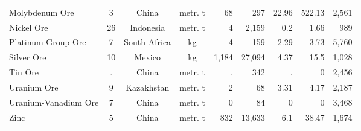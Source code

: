 \begin{tabular}{lcccrrrrr}
Molybdenum Ore & 3     & China & metr. t & 68    & 297   & 22.96 & 522.13 & 2,561  \\
Nickel Ore & 26    & Indonesia & metr. t & 4     & 2,159  & 0.2   & 1.66  & 989  \\
Platinum Group Ore & 7     & South Africa & kg    & 4     & 159   & 2.29  & 3.73  & 5,760  \\
Silver Ore & 10    & Mexico & kg    & 1,184  & 27,094  & 4.37  & 15.5  & 1,028  \\
Tin Ore & .     & China & metr. t & .     & 342   & .     & 0     & 2,456  \\
Uranium Ore & 9     & Kazakhstan & metr. t & 2     & 68    & 3.31  & 4.17  & 2,187  \\
Uranium-Vanadium Ore & 7     & China & metr. t & 0     & 84    & 0     & 0     & 3,468  \\
Zinc  & 5     & China & metr. t & 832   & 13,633  & 6.1   & 38.47 & 1,674  \bigstrut[b]\\
\hline
\end{tabular}%